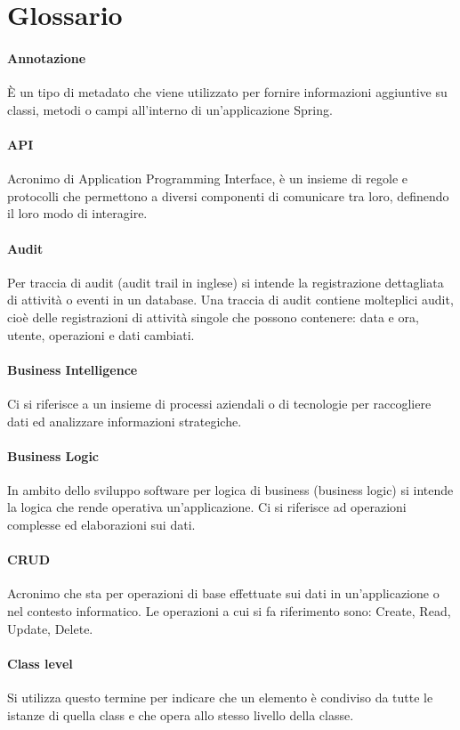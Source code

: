 \chapter{Glossario}
\label{cap:glossario}

\subsubsection*{Annotazione}
È un tipo di metadato che viene utilizzato per fornire informazioni aggiuntive su classi, metodi o campi all'interno di un'applicazione Spring. 
\subsubsection*{API}
Acronimo di Application Programming Interface, è un insieme di regole e protocolli che permettono a diversi componenti di comunicare tra loro, definendo il loro modo di interagire.
\subsubsection*{Audit}
Per traccia di audit (audit trail in inglese) si intende la registrazione dettagliata di attività o eventi in un database. Una traccia di audit contiene molteplici audit, cioè delle registrazioni di attività singole che possono contenere: data e ora, utente, operazioni e dati cambiati.
\subsubsection*{Business Intelligence}
Ci si riferisce a un insieme di processi aziendali o di tecnologie per raccogliere dati ed analizzare informazioni strategiche.
\subsubsection*{Business Logic}
In ambito dello sviluppo software per logica di business (business logic) si intende la logica che rende operativa un'applicazione. Ci si riferisce ad operazioni complesse ed elaborazioni sui dati.
\subsubsection*{CRUD}
Acronimo che sta per operazioni di base effettuate sui dati in un'applicazione o nel contesto informatico. Le operazioni a cui si fa riferimento sono: Create, Read, Update, Delete.
\subsubsection*{Class level}
Si utilizza questo termine per indicare che un elemento è condiviso da tutte le istanze di quella class e che opera allo stesso livello della classe.
